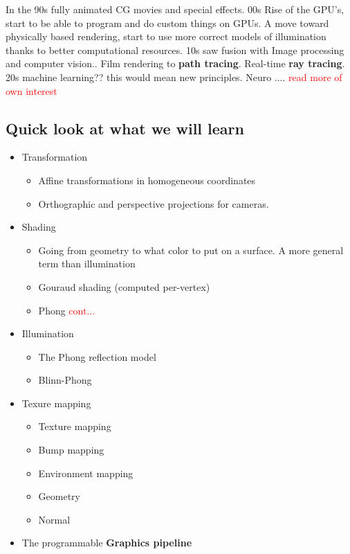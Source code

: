 In the 90s fully animated CG movies and special effects. 00s Rise of the GPU's, start to be able to program and do custom things on GPUs. A move toward physically based rendering, start to use more correct models of illumination thanks to better computational resources. 10s saw fusion with Image processing and computer vision.. Film rendering to \textbf{path tracing}. Real-time \textbf{ray tracing}. 20s machine learning?? this would mean new principles. Neuro .... \textcolor{red}{read more of own interest} 


\subsection*{Quick look at what we will learn}
\begin{itemize}
	\item Transformation
	\begin{itemize}
		\item Affine transformations in homogeneous coordinates
		\item Orthographic and perspective projections for cameras.
	\end{itemize}
	\item Shading
	\begin{itemize}
		\item Going from geometry to what color to put on a surface. A more general term than illumination 
		\item Gouraud shading (computed per-vertex)
		\item Phong \textcolor{red}{cont...} 
	\end{itemize}
	\item Illumination
	\begin{itemize}
		\item The Phong reflection model
		\item Blinn-Phong
	\end{itemize}
	\item Texure mapping
	\begin{itemize}
		\item Texture mapping
		\item Bump mapping
		\item Environment mapping
		\item Geometry
		\item Normal
	\end{itemize}
	\item The programmable \textbf{Graphics pipeline}
\end{itemize}




